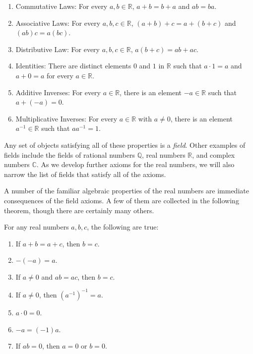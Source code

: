 \begin{enumerate}
\item Commutative Laws: For every $a,b\in\mathbb R$, $a+b=b+a$ and $ab=ba$.
\item Associative Laws: For every $a,b,c\in\mathbb R$, $(a+b)+c=a+(b+c)$ and $(ab)c=a(bc)$.
\item Distributive Law: For every $a,b,c\in\mathbb R$, $a(b+c)=ab+ac$.
\item Identities: There are distinct elements $0$ and $1$ in $\mathbb R$ such that $a\cdot 1=a$ and $a+0=a$ for every $a\in\mathbb R$.
\item Additive Inverses: For every $a\in\mathbb R$, there is an element $-a\in\mathbb R$ such that $a+(-a)=0$.
\item Multiplicative Inverses: For every $a\in\mathbb R$ with $a\neq0$, there is an element $a^{-1}\in\mathbb R$ such that $aa^{-1}=1$.
\end{enumerate}

Any set of objects satisfying all of these properties is a \emph{field}. Other examples of fields include the fields of rational numbers $\mathbb Q$, real numbers $\mathbb R$, and complex numbers $\mathbb C$. As we develop further axioms for the real numbers, we will also narrow the list of fields that satisfy all of the axioms.

A number of the familiar algebraic properties of the real numbers are immediate consequences of the field axioms. A few of them are collected in the following theorem, though there are certainly many others.

\begin{thrm}\label{thrm:algebra}
For any real numbers $a,b,c$, the following are true:
\begin{enumerate}
\item If $a+b=a+c$, then $b=c$. \label{thrm:addcanc}
\item $-(-a)=a$. \label{thrm:addinvinv}
\item If $a\neq 0$ and $ab=ac$, then $b=c$. \label{thrm:multcanc}
\item If $a\neq 0$, then $(a^{-1})^{-1}=a$. \label{thrm:multinvinv}
\item $a\cdot 0=0$. \label{thrm:zeromult}
\item $-a=(-1)a$. \label{thrm:addinv}
\item If $ab=0$, then $a=0$ or $b=0$. \label{thrm:zerofactor}
\end{enumerate}
\end{thrm}

